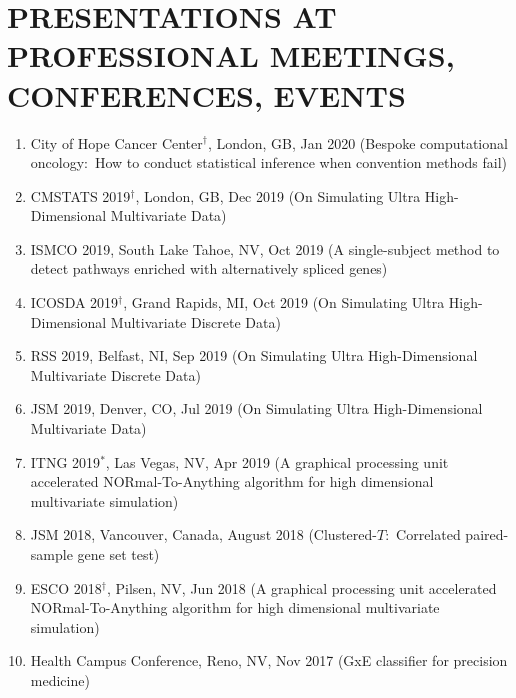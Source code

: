 \documentclass[paper=a4,fontsize=11pt]{scrartcl} %
\newcommand{\NewPart}[2]{\section*{\uppercase{#1} #2 }}
\newcommand{\TalkEntry}[4]{
		\noindent #1, #2, #3 #4}
\begin{document}

\NewPart{Presentations at professional meetings, conferences, events}{}
\vspace{-7pt}
\begin{enumerate}

\item \TalkEntry{City of Hope Cancer Center$^{\dagger}$}{London, GB}{Jan 2020}{(Bespoke computational oncology:~How to conduct statistical inference when convention methods fail)}
  
\item \TalkEntry{CMSTATS 2019$^{\dagger}$}{London, GB}{Dec 2019}{(On Simulating Ultra High-Dimensional Multivariate Data)}

\item \TalkEntry{ISMCO 2019}{South Lake Tahoe, NV}{Oct 2019}{(A single-subject method to detect pathways enriched with alternatively spliced genes)}
  
\item \TalkEntry{ICOSDA 2019$^{\dagger}$}{Grand Rapids, MI}{Oct 2019}{(On Simulating Ultra High-Dimensional Multivariate Discrete Data)}
  
\item \TalkEntry{RSS 2019}{Belfast, NI}{Sep 2019}{(On Simulating Ultra High-Dimensional Multivariate Discrete Data)}
  
\item \TalkEntry{JSM 2019}{Denver, CO}{Jul 2019}{(On Simulating Ultra High-Dimensional Multivariate Data)}
  
    \item \TalkEntry{ITNG 2019$^{*}$}{Las Vegas, NV}{Apr 2019}{(A graphical processing unit accelerated NORmal-To-Anything algorithm for high dimensional multivariate simulation)}
  
\item\TalkEntry{JSM 2018}{Vancouver, Canada}{August 2018}{(Clustered-$T$:~Correlated paired-sample gene set test)}

      \item \TalkEntry{ESCO 2018$^{\dagger}$}{Pilsen, NV}{Jun 2018}{(A graphical processing unit accelerated NORmal-To-Anything algorithm for high dimensional multivariate simulation)}

\item\TalkEntry{Health Campus Conference}{Reno, NV}{Nov 2017}{(GxE classifier for precision medicine)}
  

\end{enumerate}
\end{document}
